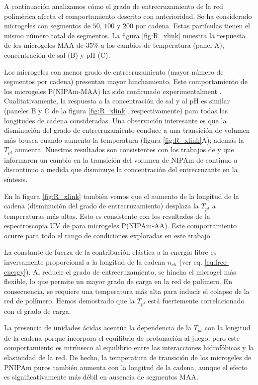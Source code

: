 A continuaci\'on analizamos c\'omo el grado de entrecruzamiento de la red polim\'erica afecta el comportamiento descrito con anterioridad.
Se ha considerado microgeles con segmentos de $50$, $100$ y $200$ por cadena.
Estas part\'iculas tienen el mismo n\'umero total de segmentos.
La figura \ref{fig:R_xlink} muestra la respuesta de los microgeles MAA de $35\%$ a los cambios de temperatura (panel A), concentraci\'on de sal (B) y pH (C).

Los microgeles con menor grado de entrecruzamiento (mayor n\'umero de segmentos por cadena) presentan mayor hinchamiento.
Este comportamiento de los microgeles P(NIPAm-MAA) ha sido confirmado experimentalment  \cite{khan2013preparation}.
Cualitativamente, la respuesta a la concentraci\'on de sal y al pH es similar (paneles B y C de la figura \ref{fig:R_xlink}, respectivamente) para todas las longitudes de cadena consideradas.
Una observaci\'on interesante es que la disminuci\'on del grado de entrecruzamiento conduce a una transici\'on de volumen m\'as brusca cuando aumenta la temperatura (figura \ref{fig:R_xlink}A);
adem\'as la  $T_{pt}$ aumenta.
Nuestros resultados son consistentes con los trabajos de \citet{li1989study} y  \citet{wu1997volume} que informaron un cambio en la transici\'on del volumen de NIPAm de continuo a discontinuo a medida que disminuye la concentraci\'on del entrecruzante en la s\'intesis.


En la figura \ref{fig:R_xlink} tambi\'en vemos que el aumento de la longitud de la cadena (disminuci\'on del grado de entrecruzamiento) desplaza la $T_{pt}$ a temperaturas m\'as altas.
Esto es consistente con los resultados de la espectroscopia UV de  \citet{Lee2008} para microgeles P(NIPAm-AA).
Este comportamiento ocurre para todo el rango de condiciones exploradas en este trabajo %


La constante de fuerza de la contribuci\'on el\'astica a la energ\'ia libre es inversamente proporcional a la longitud de la cadena $n_{ch}$ (ver eq. \ref{eq:free-energy}).
Al reducir el grado de entrecruzamiento, se hincha el microgel m\'as flexible, lo que permite un mayor grado de carga en la red de pol\'imero.
En consecuencia, se requiere una temperatura m\'as alta para inducir el colapso de la red de pol\'imero.
Hemos demostrado que la $T_{pt}$ est\'a fuertemente correlacionado con el grado de carga.


La presencia de unidades \'acidas acent\'ua la dependencia de  la $T_{pt}$ con la longitud de la cadena porque incorpora el equilibrio de protonaci\'on al juego, pero este comportamiento es intr\'inseco al equilibrio entre las interacciones hidrof\'obicas y la elasticidad de la red.
De hecho, la temperatura de transici\'on de los microgeles de PNIPAm puros tambi\'en aumenta con la longitud de la cadena, aunque el efecto es significativamente m\'as d\'ebil en ausencia de segmentos MAA.


